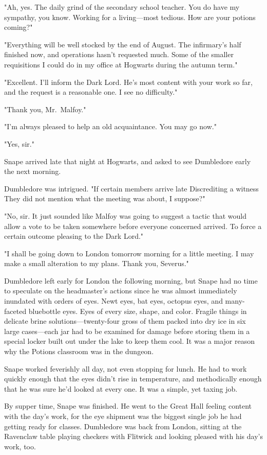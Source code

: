 "Ah, yes. The daily grind of the secondary school teacher. You do have my sympathy, you know. Working for a living—most tedious. How are your potions coming?"

"Everything will be well stocked by the end of August. The infirmary's half finished now, and operations hasn't requested much. Some of the smaller requisitions I could do in my office at Hogwarts during the autumn term."

"Excellent. I'll inform the Dark Lord. He's most content with your work so far, and the request is a reasonable one. I see no difficulty."

"Thank you, Mr.~Malfoy."

"I'm always pleased to help an old acquaintance. You may go now."

"Yes, sir."

Snape arrived late that night at Hogwarts, and asked to see Dumbledore early the next morning.

Dumbledore was intrigued. "If certain members arrive late{\el} Discrediting a witness{\el} They did not mention what the meeting was about, I suppose?"

"No, sir. It just sounded like Malfoy was going to suggest a tactic that would allow a vote to be taken somewhere before everyone concerned arrived. To force a certain outcome pleasing to the Dark Lord."

"I shall be going down to London tomorrow morning for a little meeting. I may make a small alteration to my plans. Thank you, Severus."

Dumbledore left early for London the following morning, but Snape had no time to speculate on the headmaster's actions since he was almost immediately inundated with orders of eyes. Newt eyes, bat eyes, octopus eyes, and many-faceted bluebottle eyes. Eyes of every size, shape, and color. Fragile things in delicate brine solutions—twenty-four gross of them packed into dry ice in six large cases—each jar had to be examined for damage before storing them in a special locker built out under the lake to keep them cool. It was a major reason why the Potions classroom was in the dungeon.

Snape worked feverishly all day, not even stopping for lunch. He had to work quickly enough that the eyes didn't rise in temperature, and methodically enough that he was sure he'd looked at every one. It was a simple, yet taxing job.

By supper time, Snape was finished. He went to the Great Hall feeling content with the day's work, for the eye shipment was the biggest single job he had getting ready for classes. Dumbledore was back from London, sitting at the Ravenclaw table playing checkers with Flitwick and looking pleased with his day's work, too.

